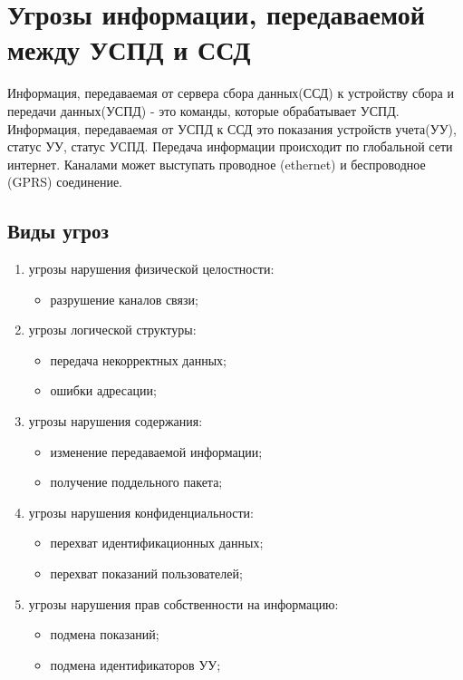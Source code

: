 \newpage
\section{Угрозы информации, передаваемой между УСПД и ССД}
\setcounter{figure}{0}

Информация, передаваемая от сервера сбора данных(ССД) к устройству сбора и передачи данных(УСПД) - это команды, которые обрабатывает УСПД. Информация, передаваемая от УСПД к ССД это показания устройств учета(УУ), статус УУ, статус УСПД. Передача информации происходит по глобальной сети интернет. Каналами может выступать проводное (ethernet) и беспроводное (GPRS) соединение.

\subsection{Виды угроз}

\begin{enumerate}
 \item угрозы нарушения физической целостности:
 \begin{itemize}
  \item разрушение каналов связи;
 \end{itemize}
 
 \item угрозы логической структуры:
 \begin{itemize}
  \item передача некорректных данных;
  \item ошибки адресации;
 \end{itemize}
 
 \item угрозы нарушения содержания:
 \begin{itemize}
  \item изменение передаваемой информации;
  \item получение поддельного пакета;
 \end{itemize}
 
 \item угрозы нарушения конфиденциальности:
 \begin{itemize}
  \item перехват идентификационных данных;
  \item перехват показаний пользователей;
 \end{itemize}
 
 \item угрозы нарушения прав собственности на информацию:
 \begin{itemize}
  \item подмена показаний;
  \item подмена идентификаторов УУ;
 \end{itemize}
 
\end{enumerate}

